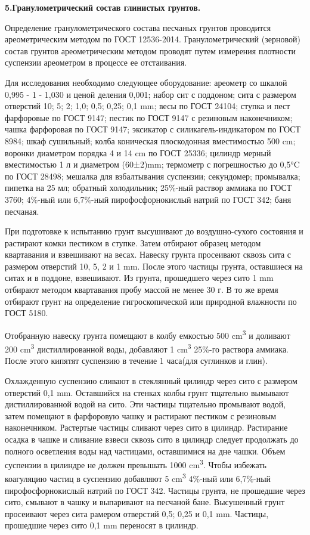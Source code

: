 \textbf{5.Гранулометрический состав глинистых грунтов.}

Определение гранулометрического состава песчаных грунтов проводится ареометрическим методом 
по ГОСТ 12536-2014. Гранулометрический (зерновой) состав грунтов
ареометрическим методом проводят путем измерения плотности суспензии
ареометром в процессе ее отстаивания. 

Для исследования необходимо следующее оборудование: ареометр со шкалой 0,995 - 1 - 1,030 и ценой 
деления 0,001; набор сит с поддоном; сита с размером отверстий 10; 5; 2; 1,0; 0,5; 0,25;
0,1 \si{\milli\meter}; весы по ГОСТ 24104; ступка и пест фарфоровые по ГОСТ 9147; пестик 
по ГОСТ 9147 с резиновым 
наконечником; чашка фарфоровая по ГОСТ 9147; эксикатор с силикагель-индикатором по ГОСТ 8984;
шкаф сушильный; колба коническая плоскодонная вместимостью 500 \si{\centi\meter};
воронки диаметром порядка 4 и 14 \si{\centi\meter} по ГОСТ 25336; цилиндр мерный вместимостью 1 л 
и диаметром (60±2)\si{\milli\meter}; термометр с погрешностью до 0,5\si{\degreeCelsius} по ГОСТ 28498;
мешалка для взбалтывания суспензии; секундомер; промывалка; пипетка на 25 мл;
обратный холодильник; 25\%-ный раствор аммиака по ГОСТ 3760;
4\%-ный или 6,7\%-ный пирофосфорнокислый натрий по ГОСТ 342; баня песчаная.


При подготовке к испытанию грунт высушивают до воздушно-сухого состояния 
и растирают комки пестиком в ступке. Затем отбирают образец методом квартавания 
и взвешивают на весах. Навеску грунта просеивают сквозь сита с размером отверстий 10, 5, 
2 и 1 \si{\milli\meter}. После этого частицы грунта, оставшиеся на ситах и в поддоне, взвешивают.
Из грунта, прошедшего через сито 1 \si{\milli\meter} отбирают методом квартавания пробу массой не менее 
30 г. В то же время отбирают грунт на определение гигроскопической или природной влажности по ГОСТ 5180.

Отобранную навеску грунта помещают в колбу емкостью 500 \si{\centi\meter^3} и доливают 200 
\si{\centi\meter^3} дистиллированной воды, добавляют 1 \si{\centi\meter^3} 25\%-го раствора
аммиака. После этого кипятят суспензию в течение 1 часа(для суглинков и глин).

Охлажденную суспензию сливают в стеклянный цилиндр через сито с размером отверстий 
0,1 \si{\milli\meter}. Оставшийся на стенках колбы грунт тщательно вымывают дистиллированной водой 
на сито. Эти частицы тщательно промывают водой, затем помещают в фарфоровую чашку и растирают 
пестиком с резиновым наконечником. Растертые частицы сливают через сито в цилиндр. 
Растирание осадка в чашке и сливание взвеси сквозь сито в цилиндр
следует продолжать до полного осветления воды над частицами,
оставшимися на дне чашки. Объем суспензии в цилиндре не должен превышать 1000 \si{\centi\meter^3}.
Чтобы избежать коагуляцию частиц в суспензию добавляют 5 \si{\centi\meter^3} 
4\%-ный или 6,7\%-ный пирофосфорнокислый натрий по ГОСТ 342. Частицы грунта, не прошедшие через сито, 
смывают в чашку и выпаривают на песчаной бане. Высушенный грунт просеивают через сита 
рамером отверстий 0,5; 0,25 и 0,1 \si{\milli\meter}. Частицы, прошедшие через сито 0,1 \si{\milli\meter} 
переносят в цилиндр.

